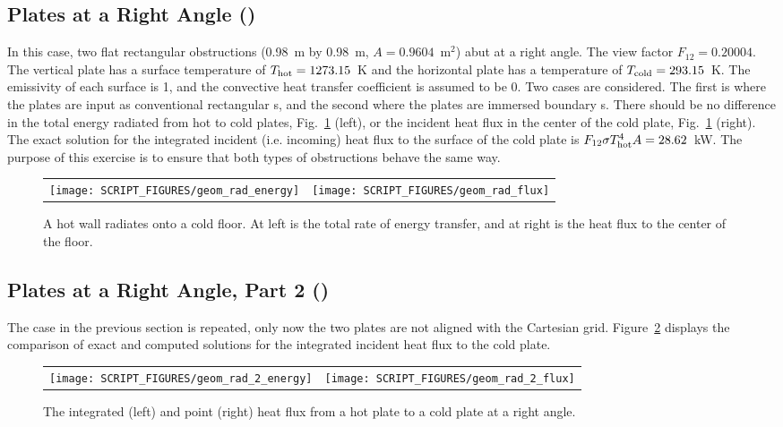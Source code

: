 \documentclass[11pt]{book}
\begin{document}
\subsection{Plates at a Right Angle (\texorpdfstring{}{geom\_rad}) }
\label{geom_rad}

In this case, two flat rectangular obstructions (0.98~m by 0.98~m, $A=0.9604$~m$^2$) abut at a right angle. The view factor $F_{12}=0.20004$. The vertical plate has a surface temperature of $T_{\rm hot}=1273.15$~K and the horizontal plate has a temperature of $T_{\rm cold}=293.15$~K. The emissivity of each surface is 1, and the convective heat transfer coefficient is assumed to be 0. Two cases are considered. The first is where the plates are input as conventional rectangular s, and the second where the plates are immersed boundary s. There should be no difference in the total energy radiated from hot to cold plates, Fig.~\ref{geom_rad_fig} (left), or the incident heat flux in the center of the cold plate, Fig.~\ref{geom_rad_fig} (right). The exact solution for the integrated incident (i.e. incoming) heat flux to the surface of the cold plate is $F_{12} \sigma T_{\rm hot}^4 A= 28.62$~kW. The purpose of this exercise is to ensure that both types of obstructions behave the same way.

\begin{figure}[!ht]
\begin{tabular*}{\textwidth}{lr}
\texttt{[image: SCRIPT\_FIGURES/geom\_rad\_energy]} &
\texttt{[image: SCRIPT\_FIGURES/geom\_rad\_flux]}
\end{tabular*}
\caption[Results of the  test case]{A hot wall radiates onto a cold floor. At left is the total rate of energy transfer, and at right is the heat flux to the center of the floor.}
\label{geom_rad_fig}
\end{figure}

\subsection{Plates at a Right Angle, Part 2 (\texorpdfstring{}{geom\_rad\_2}) }
\label{geom_rad_2}

The case in the previous section is repeated, only now the two plates are not aligned with the Cartesian grid. Figure~\ref{geom_rad_2_fig} displays the comparison of exact and computed solutions for the integrated incident heat flux to the cold plate.

\begin{figure}[!ht]
\begin{tabular*}{\textwidth}{lr}
\texttt{[image: SCRIPT\_FIGURES/geom\_rad\_2\_energy]} &
\texttt{[image: SCRIPT\_FIGURES/geom\_rad\_2\_flux]}
\end{tabular*}
\caption[Results of the  test case]{The integrated (left) and point (right) heat flux from a hot plate to a cold plate at a right angle.}
\label{geom_rad_2_fig}
\end{figure}
\end{document}
